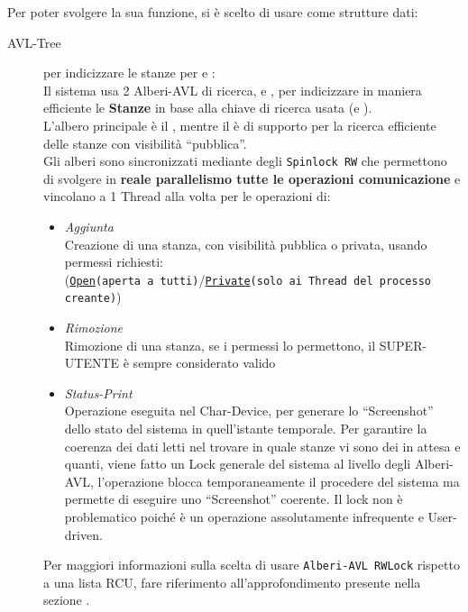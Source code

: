 Per poter svolgere la sua funzione, si è scelto di usare come strutture dati:
\begin{description}
\item[AVL-Tree] per indicizzare le stanze per \tagSys e \keySys:\\
    Il sistema usa 2 Alberi-AVL di ricerca, \tagTree e \keyTree, per indicizzare in maniera efficiente le
    \textbf{Stanze} in base alla chiave di ricerca usata (\tagSys e \keySys). \\
    L'albero principale è il \tagTree, mentre il \keyTree è di supporto per la ricerca efficiente delle
    stanze con visibilità ``pubblica''.\\
    Gli alberi sono sincronizzati mediante degli \texttt{Spinlock RW} che permettono di svolgere in \textbf{reale
    parallelismo tutte le operazioni comunicazione} e vincolano a 1 Thread alla volta per le operazioni di:
    \begin{itemize}
    \item \textit{Aggiunta} \\
        Creazione di una stanza, con visibilità pubblica o privata, usando permessi richiesti:\\
        (\texttt{\underline{Open}(aperta a tutti)}/\texttt{\underline{Private}(solo ai Thread del processo creante)})
    \item \textit{Rimozione} \\
        Rimozione di una stanza, se i permessi lo permettono, il SUPER-UTENTE è sempre considerato valido
    \item \textit{Status-Print} \\
        Operazione eseguita nel Char-Device, per generare lo ``Screenshot'' dello stato del sistema in quell'istante
        temporale. Per garantire la coerenza dei dati letti nel trovare in quale stanze vi sono dei \Reader in attesa e
        quanti, viene fatto un Lock generale del sistema al livello degli Alberi-AVL, l'operazione blocca
        temporaneamente il procedere del sistema ma permette di eseguire uno ``Screenshot'' coerente.
        Il lock non è problematico poiché è un operazione assolutamente infrequente e User-driven.
\end{itemize}

\begin{footnotesize}
Per maggiori informazioni sulla scelta di usare \texttt{Alberi-AVL RWLock} rispetto a una lista
RCU, fare riferimento all'approfondimento presente nella sezione .
\end{footnotesize}


\end{description}
